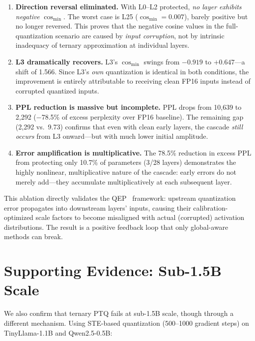 \documentclass[10pt,a4paper]{article}
\begin{document}
\begin{enumerate}
    \item \textbf{Direction reversal eliminated.} With L0--L2 protected, \textit{no layer exhibits negative} $\cos_{\min}$. The worst case is L25 ($\cos_{\min} = 0.007$), barely positive but no longer reversed. This proves that the negative cosine values in the full-quantization scenario are caused by \textit{input corruption}, not by intrinsic inadequacy of ternary approximation at individual layers.

    \item \textbf{L3 dramatically recovers.} L3's $\cos_{\min}$ swings from $-0.919$ to $+0.647$---a shift of 1.566. Since L3's \textit{own} quantization is identical in both conditions, the improvement is entirely attributable to receiving clean FP16 inputs instead of corrupted quantized inputs.

    \item \textbf{PPL reduction is massive but incomplete.} PPL drops from 10,639 to 2,292 ($-$78.5\% of excess perplexity over FP16 baseline). The remaining gap (2,292 vs.\ 9.73) confirms that even with clean early layers, the cascade \textit{still occurs} from L3 onward---but with much lower initial amplitude.

    \item \textbf{Error amplification is multiplicative.} The 78.5\% reduction in excess PPL from protecting only 10.7\% of parameters (3/28 layers) demonstrates the highly nonlinear, multiplicative nature of the cascade: early errors do not merely add---they accumulate multiplicatively at each subsequent layer.
\end{enumerate}

This ablation directly validates the QEP~\citep{qep2025} framework: upstream quantization error propagates into downstream layers' inputs, causing their calibration-optimized scale factors to become misaligned with actual (corrupted) activation distributions. The result is a positive feedback loop that only global-aware methods can break.

\section{Supporting Evidence: Sub-1.5B Scale}
\label{sec:small}

We also confirm that ternary PTQ fails at sub-1.5B scale, though through a different mechanism.
Using STE-based quantization (500--1000 gradient steps) on TinyLlama-1.1B and Qwen2.5-0.5B:
\end{document}
